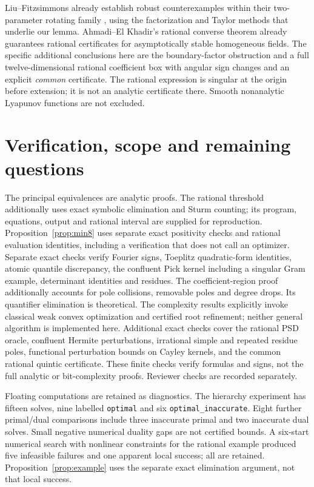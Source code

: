 \documentclass[11pt,a4paper]{article}
\theoremstyle{remark}\newtheorem{remark}[theorem]{Remark}
\begin{document}
Liu--Fitzsimmons already establish robust counterexamples within
their two-parameter rotating family \cite[Section~IV.D]{liu},
using the factorization and Taylor methods that underlie our lemma.
Ahmadi--El Khadir's rational converse theorem
\cite[Theorem~3.1]{ahmadi-khadir} already guarantees rational
certificates for asymptotically stable homogeneous fields.
The specific additional conclusions here are the boundary-factor
obstruction and a full twelve-dimensional rational coefficient box
with angular sign changes and an explicit \emph{common} certificate.
The rational expression is singular at the origin before extension;
it is not an analytic certificate there. Smooth nonanalytic
Lyapunov functions are not excluded.

\section{Verification, scope and remaining questions}
The principal equivalences are analytic proofs.
The rational threshold additionally uses exact symbolic elimination
and Sturm counting; its program, equations, output and rational
interval are supplied for reproduction. Proposition~\ref{prop:min8}
uses separate exact positivity checks and rational evaluation identities,
including a verification that does not call an optimizer.
Separate exact checks verify Fourier signs, Toeplitz quadratic-form
identities, atomic quantile discrepancy, the confluent Pick kernel
including a singular Gram example, determinant identities and residues.
The coefficient-region proof additionally accounts for pole collisions,
removable poles and degree drops. Its quantifier elimination is theoretical.
The complexity results explicitly invoke classical weak convex optimization
and certified root refinement; neither general algorithm is implemented here.
Additional exact checks cover the rational PSD oracle, confluent Hermite
perturbations, irrational simple and repeated residue poles, functional
perturbation bounds on Cayley kernels, and the common rational quintic
certificate. These finite checks verify formulas and signs, not the full
analytic or bit-complexity proofs. Reviewer checks are recorded separately.

Floating computations are retained as diagnostics. The hierarchy
experiment has fifteen solves, nine labelled \texttt{optimal} and
six \texttt{optimal\_inaccurate}. Eight further primal/dual comparisons
include three inaccurate primal and two inaccurate dual solves.
Small negative numerical duality gaps are not certified bounds.
A six-start numerical search with nonlinear constraints for the rational
example produced five
infeasible failures and one apparent local success; all are retained.
Proposition~\ref{prop:example} uses the separate exact elimination
argument, not that local success.
\end{document}
